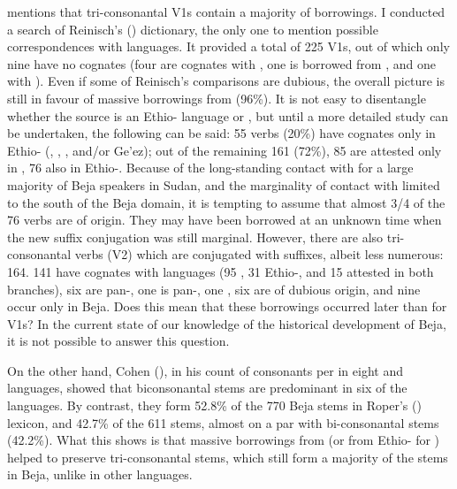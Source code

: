 \documentclass[output=paper]{langsci/langscibook}
\begin{document}
\citet{Cohen1988} mentions that tri-consonantal V1s contain a majority of  borrowings. I conducted a search of Reinisch's (\citeyear{Reinisch1895}) dictionary, the only one to mention possible correspondences with  languages. It provided a total of 225 V1s, out of which only nine have no  cognates (four are cognates with , one is borrowed from , and one  with ). Even if some of Reinisch’s comparisons are dubious, the overall picture is still in favour of massive borrowings from  (96\%). It is not easy to disentangle whether the source is an Ethio- language or , but until a more detailed study can be undertaken, the following can be said: 55 verbs (20\%) have cognates only in Ethio- (, , , and/or Ge’ez); out of the remaining 161 (72\%), 85 are attested only in , 76 also in Ethio-. Because of the long-standing contact with  for a large majority of Beja speakers in Sudan, and the marginality of contact with  limited to the south of the Beja domain, it is tempting to assume that almost 3/4 of the 76 verbs are of  origin. They may have been borrowed at an unknown time when the new suffix conjugation was still marginal. However, there are also tri-consonantal verbs (V2) which are conjugated with suffixes, albeit less numerous: 164. 141 have cognates with  languages (95 , 31 Ethio-, and 15 attested in both branches), six are pan-, one is pan-, one , six are of dubious origin, and nine occur only in Beja. Does this mean that these borrowings occurred later than for V1s? In the current state of our knowledge of the historical development of Beja, it is not possible to answer this question.

On the other hand, Cohen (\citeyear[256]{Cohen1988}), in his count of consonants per  in eight  and  languages, showed that biconsonantal stems are predominant in six of the languages. By contrast, they form 52.8\% of the 770 Beja stems in Roper's (\citeyear{Roper1928}) lexicon, and 42.7\% of the 611  stems, almost on a par with bi-consonantal stems (42.2\%). What this shows is that massive borrowings from  (or from Ethio- for ) helped to preserve tri-consonantal stems, which still form a majority of the stems in Beja, unlike in other  languages.
\end{document}
